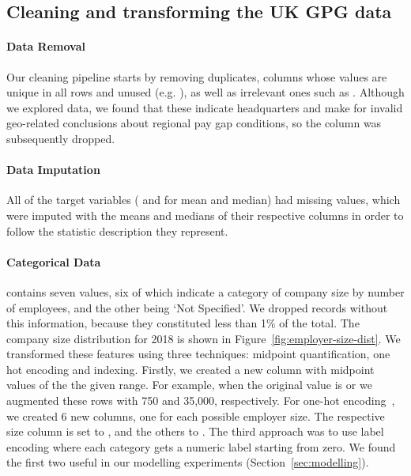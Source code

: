 \subsection{Cleaning and transforming the UK GPG data}
\paragraph{Data Removal} Our cleaning pipeline starts by removing duplicates, columns whose values are unique in all rows and unused (e.g. ), as well as irrelevant ones such as . Although we explored  data, we found that these indicate headquarters and make for invalid geo-related conclusions about regional pay gap conditions, so the column was subsequently dropped.

\paragraph{Data Imputation} All of the target variables ( and  for mean and median) had missing values, which were imputed with the means and medians of their respective columns in order to follow the statistic description they represent.

\paragraph{Categorical Data} 
 contains seven values, six of which indicate a category of company size by number of employees, and the other being `Not Specified'. We dropped records without this information, because they constituted less than 1\% of the total. The company size distribution for 2018 is shown in Figure\ \ref{fig:employer-size-dist}.
We transformed these features using three techniques: midpoint quantification, one hot encoding and indexing. Firstly, we created a new column with midpoint values of the the given range. For example, when the original value is  or  we augmented these rows with 750 and 35,000, respectively. For one-hot encoding\ \cite{pandas-get-dummies}, we created 6 new columns, one for each possible employer size. The respective size column is set to , and the others to . The third approach was to use label encoding where each category gets a numeric label starting from zero. We found the first two useful in our modelling experiments (Section\ \ref{sec:modelling}).

